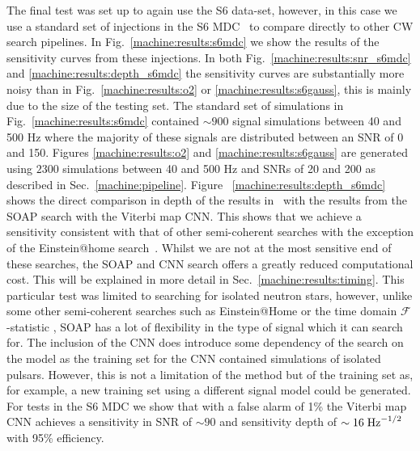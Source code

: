 %
The final test was set up to again use the S6 data-set, however, in this case
we use a standard set of injections in the S6
\gls{MDC}~\citep{walsh2016ComparisonMethods} to compare directly to other \gls{CW}
search pipelines. In Fig.~\ref{machine:results:s6mdc} we show the results of the
sensitivity curves from these injections. 
In both Fig.~\ref{machine:results:snr_s6mdc} and \ref{machine:results:depth_s6mdc} the sensitivity curves are substantially more noisy than in Fig.~\ref{machine:results:o2} or \ref{machine:results:s6gauss}, this is mainly due to the size of the testing set.
The standard set of simulations in Fig.~\ref{machine:results:s6mdc} contained $\sim 900$ signal simulations between 40 and 500 Hz where the majority of these signals are distributed between an \gls{SNR} of 0 and 150. 
Figures \ref{machine:results:o2} and \ref{machine:results:s6gauss} are generated using $2300$ simulations between 40 and 500 Hz and \glspl{SNR} of 20 and 200 as described in Sec.~\ref{machine:pipeline}.
Figure ~\ref{machine:results:depth_s6mdc} shows the direct comparison in depth of the
results in~\citep{walsh2016ComparisonMethods} with the results from the SOAP
search with the Viterbi map \gls{CNN}. This shows that we achieve a sensitivity
consistent with that of other semi-coherent searches with the
exception of the Einstein@home search~\citep{abbott2016ResultsDeepest}. Whilst
we are not at the most sensitive end of these searches, the SOAP and \gls{CNN}
search offers a greatly reduced computational cost. This will be explained in more detail in
Sec.~\ref{machine:results:timing}. This particular test was limited to searching for
isolated neutron stars, however, unlike some other semi-coherent searches such as Einstein@Home \citep{singh2016ResultsAllsky} or the time domain $\mathcal{F}$-statistic \citep{aasi2014ImplementationTextdollar}, SOAP has a lot of flexibility in the type of signal which it can search for.
The inclusion of the \gls{CNN} does introduce some dependency of the search
on the model as the training set for the \gls{CNN} contained simulations of isolated pulsars. 
However, this is not a limitation of the method but of the training set as, for example, a new training set using a different signal model could be generated. 
For tests in the S6 \gls{MDC} we show that with a false alarm of 1\% the Viterbi map
\gls{CNN} achieves a sensitivity in SNR of $\sim 90$ and sensitivity depth of
$\sim 16\;{\rm Hz}^{-1/2}$ with 95\% efficiency.


